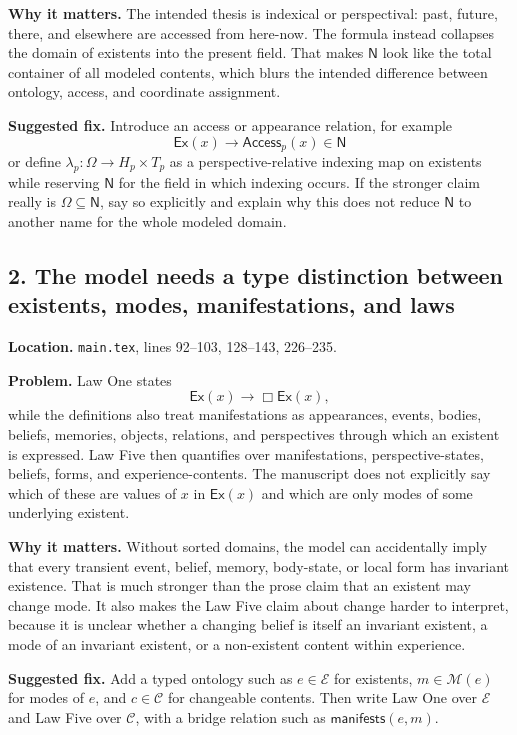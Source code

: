 \documentclass[11pt]{article}
\newcommand{\Ex}{\mathsf{Ex}}
\newcommand{\Now}{\mathsf{N}}
\begin{document}
\textbf{Why it matters.} The intended thesis is indexical or perspectival: past, future, there, and elsewhere are accessed from here-now. The formula instead collapses the domain of existents into the present field. That makes $\Now$ look like the total container of all modeled contents, which blurs the intended difference between ontology, access, and coordinate assignment.

\textbf{Suggested fix.} Introduce an access or appearance relation, for example
\[
\Ex(x)\rightarrow \mathsf{Access}_p(x)\in\Now
\]
or define $\lambda_p:\Omega\to H_p\times T_p$ as a perspective-relative indexing map on existents while reserving $\Now$ for the field in which indexing occurs. If the stronger claim really is $\Omega\subseteq\Now$, say so explicitly and explain why this does not reduce $\Now$ to another name for the whole modeled domain.

\subsection*{2. The model needs a type distinction between existents, modes, manifestations, and laws}

\textbf{Location.} \texttt{main.tex}, lines 92--103, 128--143, 226--235.

\textbf{Problem.} Law One states
\[
\Ex(x)\rightarrow\Box\Ex(x),
\]
while the definitions also treat manifestations as appearances, events, bodies, beliefs, memories, objects, relations, and perspectives through which an existent is expressed. Law Five then quantifies over manifestations, perspective-states, beliefs, forms, and experience-contents. The manuscript does not explicitly say which of these are values of $x$ in $\Ex(x)$ and which are only modes of some underlying existent.

\textbf{Why it matters.} Without sorted domains, the model can accidentally imply that every transient event, belief, memory, body-state, or local form has invariant existence. That is much stronger than the prose claim that an existent may change mode. It also makes the Law Five claim about change harder to interpret, because it is unclear whether a changing belief is itself an invariant existent, a mode of an invariant existent, or a non-existent content within experience.

\textbf{Suggested fix.} Add a typed ontology such as $e\in\mathcal{E}$ for existents, $m\in\mathcal{M}(e)$ for modes of $e$, and $c\in\mathcal{C}$ for changeable contents. Then write Law One over $\mathcal{E}$ and Law Five over $\mathcal{C}$, with a bridge relation such as $\mathsf{manifests}(e,m)$.
\end{document}
